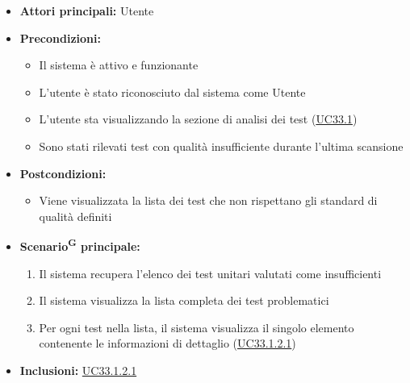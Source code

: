 \documentclass[a4paper, 11pt]{article}
\begin{document}
\begin{itemize}
    \item \textbf{Attori principali:} Utente
    \item \textbf{Precondizioni:}
    \begin{itemize}
        \item Il sistema è attivo e funzionante
        \item L'utente è stato riconosciuto dal sistema come Utente
        \item L'utente sta visualizzando la sezione di analisi dei test (\hyperref[UC33.1]{UC33.1})
        \item Sono stati rilevati test con qualità insufficiente durante l'ultima scansione
    \end{itemize}
    \item \textbf{Postcondizioni:}
    \begin{itemize}
        \item Viene visualizzata la lista dei test che non rispettano gli standard di qualità definiti
    \end{itemize}
    \item \textbf{Scenario\textsuperscript{G} principale:}
    \begin{enumerate}
        \item Il sistema recupera l'elenco dei test unitari valutati come insufficienti
        \item Il sistema visualizza la lista completa dei test problematici
        \item Per ogni test nella lista, il sistema visualizza il singolo elemento contenente le informazioni di dettaglio (\hyperref[UC33.1.2.1]{UC33.1.2.1})
    \end{enumerate}
    \item \textbf{Inclusioni:} \hyperref[UC33.1.2.1]{UC33.1.2.1}
\end{itemize}
\end{document}
